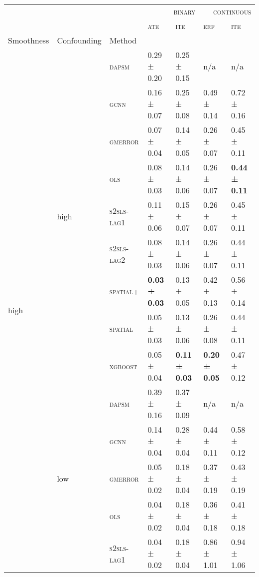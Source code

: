 \documentclass{article}
\begin{document}
\scriptsize
\begin{table}[!tbp]
\centering
\begin{tabular}{lllllll}
\toprule
 &  &  & \multicolumn{2}{r}{\textsc{binary}} & \multicolumn{2}{r}{\textsc{continuous}} \\
 &  &  & \textsc{ate} & \textsc{ite} & \textsc{erf} & \textsc{ite} \\
Smoothness & Confounding & Method &  &  &  &  \\
\midrule
\multirow[t]{18}{*}{high} & \multirow[t]{9}{*}{high} & \textsc{dapsm} & 0.29 ± {\small 0.20} & 0.25 ± {\small 0.15} & n/a & n/a \\
 &  & \textsc{gcnn} & 0.16 ± {\small 0.07} & 0.25 ± {\small 0.08} & 0.49 ± {\small 0.14} & 0.72 ± {\small 0.16} \\
 &  & \textsc{gmerror} & 0.07 ± {\small 0.04} & 0.14 ± {\small 0.05} & 0.26 ± {\small 0.07} & 0.45 ± {\small 0.11} \\
 &  & \textsc{ols} & 0.08 ± {\small 0.03} & 0.14 ± {\small 0.06} & 0.26 ± {\small 0.07} & \bf 0.44 ± {\small 0.11} \\
 &  & \textsc{s2sls-lag1} & 0.11 ± {\small 0.06} & 0.15 ± {\small 0.07} & 0.26 ± {\small 0.07} & 0.45 ± {\small 0.11} \\
 &  & \textsc{s2sls-lag2} & 0.08 ± {\small 0.03} & 0.14 ± {\small 0.06} & 0.26 ± {\small 0.07} & 0.44 ± {\small 0.11} \\
 &  & \textsc{spatial+} & \bf 0.03 ± {\small 0.03} & 0.13 ± {\small 0.05} & 0.42 ± {\small 0.13} & 0.56 ± {\small 0.14} \\
 &  & \textsc{spatial} & 0.05 ± {\small 0.03} & 0.13 ± {\small 0.06} & 0.26 ± {\small 0.08} & 0.44 ± {\small 0.11} \\
 &  & \textsc{xgboost} & 0.05 ± {\small 0.04} & \bf 0.11 ± {\small 0.03} & \bf 0.20 ± {\small 0.05} & 0.47 ± {\small 0.12} \\
\cline{2-7}
 & \multirow[t]{9}{*}{low} & \textsc{dapsm} & 0.39 ± {\small 0.16} & 0.37 ± {\small 0.09} & n/a & n/a \\
 &  & \textsc{gcnn} & 0.14 ± {\small 0.04} & 0.28 ± {\small 0.04} & 0.44 ± {\small 0.11} & 0.58 ± {\small 0.12} \\
 &  & \textsc{gmerror} & 0.05 ± {\small 0.02} & 0.18 ± {\small 0.04} & 0.37 ± {\small 0.19} & 0.43 ± {\small 0.19} \\
 &  & \textsc{ols} & 0.04 ± {\small 0.02} & 0.18 ± {\small 0.04} & 0.36 ± {\small 0.18} & 0.41 ± {\small 0.18} \\
 &  & \textsc{s2sls-lag1} & 0.04 ± {\small 0.02} & 0.18 ± {\small 0.04} & 0.86 ± {\small 1.01} & 0.94 ± {\small 1.06} \\

\end{tabular}
\end{table}
\end{document}
